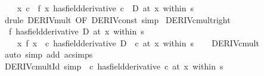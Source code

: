 \begin{isabellebody}
\ \ \ \ {\isacharparenleft}{\kern0pt}{\isacharparenleft}{\kern0pt}{\isasymlambda}x{\isachardot}{\kern0pt}\ c\ {\isacharasterisk}{\kern0pt}\ f\ x{\isacharparenright}{\kern0pt}\ has{\isacharunderscore}{\kern0pt}field{\isacharunderscore}{\kern0pt}derivative\ c\ {\isacharasterisk}{\kern0pt}\ D{\isacharparenright}{\kern0pt}\ {\isacharparenleft}{\kern0pt}at\ x\ within\ s{\isacharparenright}{\kern0pt}{\isachardoublequoteclose}\isanewline
%
\isadelimproof
\ \ %
\endisadelimproof
%
\isatagproof
{}\isamarkupfalse%
\ {\isacharparenleft}{\kern0pt}drule\ DERIV{\isacharunderscore}{\kern0pt}mult{\isacharprime}{\kern0pt}\ {\isacharbrackleft}{\kern0pt}OF\ DERIV{\isacharunderscore}{\kern0pt}const{\isacharbrackright}{\kern0pt}{\isacharparenright}{\kern0pt}\ simp%
\endisatagproof
{\isafoldproof}%
%
\isadelimproof
\isanewline
%
\endisadelimproof
\isanewline
{}\isamarkupfalse%
\ DERIV{\isacharunderscore}{\kern0pt}cmult{\isacharunderscore}{\kern0pt}right{\isacharcolon}{\kern0pt}\isanewline
\ \ {\isachardoublequoteopen}{\isacharparenleft}{\kern0pt}f\ has{\isacharunderscore}{\kern0pt}field{\isacharunderscore}{\kern0pt}derivative\ D{\isacharparenright}{\kern0pt}\ {\isacharparenleft}{\kern0pt}at\ x\ within\ s{\isacharparenright}{\kern0pt}\ {\isasymLongrightarrow}\isanewline
\ \ \ \ {\isacharparenleft}{\kern0pt}{\isacharparenleft}{\kern0pt}{\isasymlambda}x{\isachardot}{\kern0pt}\ f\ x\ {\isacharasterisk}{\kern0pt}\ c{\isacharparenright}{\kern0pt}\ has{\isacharunderscore}{\kern0pt}field{\isacharunderscore}{\kern0pt}derivative\ D\ {\isacharasterisk}{\kern0pt}\ c{\isacharparenright}{\kern0pt}\ {\isacharparenleft}{\kern0pt}at\ x\ within\ s{\isacharparenright}{\kern0pt}{\isachardoublequoteclose}\isanewline
%
\isadelimproof
\ \ %
\endisadelimproof
%
\isatagproof
{}\isamarkupfalse%
\ DERIV{\isacharunderscore}{\kern0pt}cmult\ \isamarkupfalse%
\ {\isacharparenleft}{\kern0pt}auto\ simp\ add{\isacharcolon}{\kern0pt}\ ac{\isacharunderscore}{\kern0pt}simps{\isacharparenright}{\kern0pt}%
\endisatagproof
{\isafoldproof}%
%
\isadelimproof
\isanewline
%
\endisadelimproof
\isanewline
{}\isamarkupfalse%
\ DERIV{\isacharunderscore}{\kern0pt}cmult{\isacharunderscore}{\kern0pt}Id\ {\isacharbrackleft}{\kern0pt}simp{\isacharbrackright}{\kern0pt}{\isacharcolon}{\kern0pt}\ {\isachardoublequoteopen}{\isacharparenleft}{\kern0pt}{\isacharparenleft}{\kern0pt}{\isacharasterisk}{\kern0pt}{\isacharparenright}{\kern0pt}\ c\ has{\isacharunderscore}{\kern0pt}field{\isacharunderscore}{\kern0pt}derivative\ c{\isacharparenright}{\kern0pt}\ {\isacharparenleft}{\kern0pt}at\ x\ within\ s{\isacharparenright}{\kern0pt}{\isachardoublequoteclose}\isanewline

\end{isabellebody}
